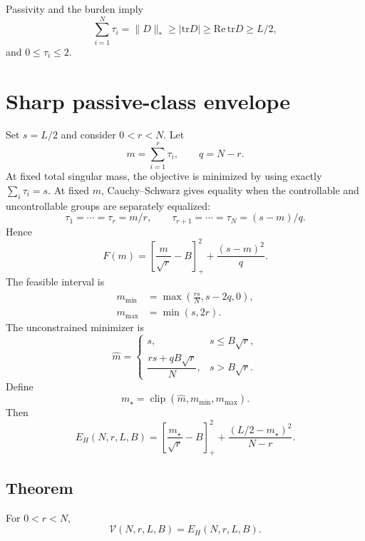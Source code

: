 \documentclass[aps,pra,onecolumn,superscriptaddress,nofootinbib]{revtex4-2}
\begin{document}
Passivity and the burden imply
\begin{equation}
\sum_{i=1}^N\tau_i=\|D\|_*\ge |\mathrm{tr}D|\ge\mathrm{Re}\,\mathrm{tr}D\ge L/2,
\end{equation}
and $0\le\tau_i\le2$.

\section{Sharp passive-class envelope}
Set $s=L/2$ and consider $0<r<N$. Let
\begin{equation}
m=\sum_{i=1}^r\tau_i,\qquad q=N-r.
\end{equation}
At fixed total singular mass, the objective is minimized by using exactly $\sum_i\tau_i=s$. At fixed $m$, Cauchy--Schwarz gives equality when the controllable and uncontrollable groups are separately equalized:
\begin{equation}
\tau_1=\cdots=\tau_r=m/r,
\qquad
\tau_{r+1}=\cdots=\tau_N=(s-m)/q.
\end{equation}
Hence
\begin{equation}
F(m)=\left[\frac{m}{\sqrt r}-B\right]_+^2+\frac{(s-m)^2}{q}.
\end{equation}
The feasible interval is
\begin{align}
m_{\min}&=\max\left(\frac{rs}{N},s-2q,0\right),\\
m_{\max}&=\min(s,2r).
\end{align}
The unconstrained minimizer is
\begin{equation}
\widehat m=
\begin{cases}
s,&s\le B\sqrt r,\\[1mm]
\dfrac{rs+qB\sqrt r}{N},&s>B\sqrt r.
\end{cases}
\end{equation}
Define
\begin{equation}
m_\star=\operatorname{clip}(\widehat m,m_{\min},m_{\max}).
\end{equation}
Then
\begin{equation}
\boxed{
E_H(N,r,L,B)=\left[\frac{m_\star}{\sqrt r}-B\right]_+^2+\frac{(L/2-m_\star)^2}{N-r}.}
\end{equation}

\subsection{Theorem}
For $0<r<N$,
\begin{equation}
\boxed{\mathcal V(N,r,L,B)=E_H(N,r,L,B).}
\end{equation}
\end{document}
